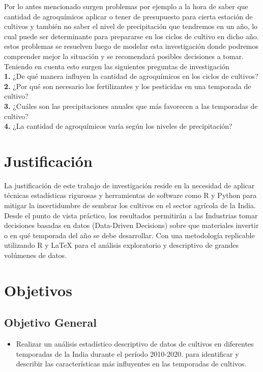 \documentclass[oneside,11pt]{Latex/Classes/PhDthesisPSnPDF}
\begin{document}
Por lo antes mencionado surgen problemas por ejemplo a la hora de saber
que cantidad de agroquímicos aplicar o tener de presupuesto para cierta
estación de cultivos y también no saber el nivel de precipitación que
tendremos en un año, lo cual puede ser determinante para prepararse en
los ciclos de cultivo en dicho año. estos problemas se resuelven luego
de modelar esta investigación donde podremos comprender mejor la
situación y se recomendará posibles decisiones a tomar. Teniendo en
cuenta esto surgen las siguientes preguntas de investigación\\

\textbf{1.} ¿De qué manera influyen la cantidad de agroquímicos en los
ciclos de cultivos?\\

\textbf{2.} ¿Por qué son necesario los fertilizantes y los pesticidas en
una temporada de cultivo?\\

\textbf{3.} ¿Cuáles son las precipitaciones anuales que más favorecen a
las temporadas de cultivo?\\

\textbf{4.} ¿La cantidad de agroquímicos varía según los niveles de
precipitación?\\

\section{Justificación}

La justificación de este trabajo de investigación reside en la necesidad
de aplicar técnicas estadísticas rigurosas y herramientas de software
como R y Python para mitigar la incertidumbre de sembrar los cultivos en
el sector agrícola de la India. Desde el punto de vista práctico, los
resultados permitirán a las Industrias tomar decisiones basadas en datos
(Data-Driven Decisions) sobre que materiales invertir o en qué temporada
del año se debe desarrollar. Con una metodología replicable utilizando R
y LaTeX para el análisis exploratorio y descriptivo de grandes volúmenes
de datos.\\

\section{Objetivos}

\subsection{Objetivo General}
\begin{itemize}
  \item{Realizar un análisis estadístico descriptivo de datos de cultivos en diferentes temporadas de la India durante el período 2010-2020.  para identificar y describir las características más influyentes en las temporadas de cultivos.}
\end{itemize}
\end{document}
